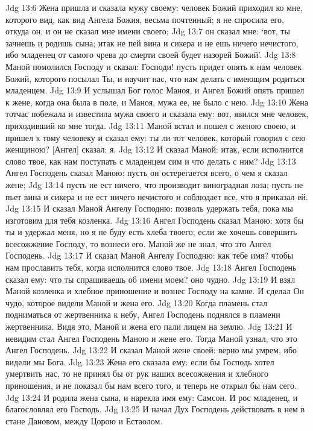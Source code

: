 Jdg 13:6  Жена пришла и сказала мужу своему: человек Божий приходил ко мне, которого вид, как вид Ангела Божия, весьма почтенный; я не спросила его, откуда он, и он не сказал мне имени своего;
Jdg 13:7  он сказал мне: `вот, ты зачнешь и родишь сына; итак не пей вина и сикера и не ешь ничего нечистого, ибо младенец от самого чрева до смерти своей будет назорей Божий'.
Jdg 13:8  Маной помолился Господу и сказал: Господи! пусть придет опять к нам человек Божий, которого посылал Ты, и научит нас, что нам делать с имеющим родиться младенцем.
Jdg 13:9  И услышал Бог голос Маноя, и Ангел Божий опять пришел к жене, когда она была в поле, и Маноя, мужа ее, не было с нею.
Jdg 13:10  Жена тотчас побежала и известила мужа своего и сказала ему: вот, явился мне человек, приходивший ко мне тогда.
Jdg 13:11  Маной встал и пошел с женою своею, и пришел к тому человеку и сказал ему: ты ли тот человек, который говорил с сею женщиною? [Ангел] сказал: я.
Jdg 13:12  И сказал Маной: итак, если исполнится слово твое, как нам поступать с младенцем сим и что делать с ним?
Jdg 13:13  Ангел Господень сказал Маною: пусть он остерегается всего, о чем я сказал жене;
Jdg 13:14  пусть не ест ничего, что производит виноградная лоза; пусть не пьет вина и сикера и не ест ничего нечистого и соблюдает все, что я приказал ей.
Jdg 13:15  И сказал Маной Ангелу Господню: позволь удержать тебя, пока мы изготовим для тебя козленка.
Jdg 13:16  Ангел Господень сказал Маною: хотя бы ты и удержал меня, но я не буду есть хлеба твоего; если же хочешь совершить всесожжение Господу, то вознеси его. Маной же не знал, что это Ангел Господень.
Jdg 13:17  И сказал Маной Ангелу Господню: как тебе имя? чтобы нам прославить тебя, когда исполнится слово твое.
Jdg 13:18  Ангел Господень сказал ему: что ты спрашиваешь об имени моем? оно чудно.
Jdg 13:19  И взял Маной козленка и хлебное приношение и вознес Господу на камне. И сделал Он чудо, которое видели Маной и жена его.
Jdg 13:20  Когда пламень стал подниматься от жертвенника к небу, Ангел Господень поднялся в пламени жертвенника. Видя это, Маной и жена его пали лицем на землю.
Jdg 13:21  И невидим стал Ангел Господень Маною и жене его. Тогда Маной узнал, что это Ангел Господень.
Jdg 13:22  И сказал Маной жене своей: верно мы умрем, ибо видели мы Бога.
Jdg 13:23  Жена его сказала ему: если бы Господь хотел умертвить нас, то не принял бы от рук наших всесожжения и хлебного приношения, и не показал бы нам всего того, и теперь не открыл бы нам сего.
Jdg 13:24  И родила жена сына, и нарекла имя ему: Самсон. И рос младенец, и благословлял его Господь.
Jdg 13:25  И начал Дух Господень действовать в нем в стане Дановом, между Цорою и Естаолом.

